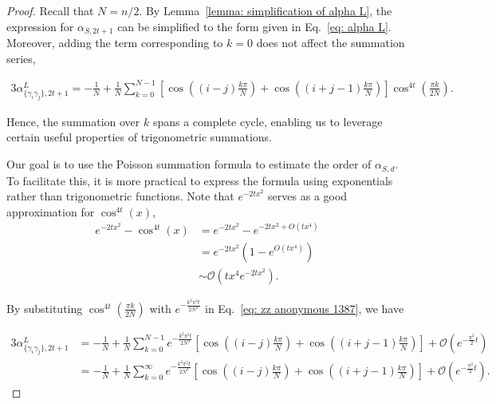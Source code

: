 \documentclass[journal=jctcce,a4paper,manuscript=article]{achemso}
\newcommand{\alpl}{\alpha_{\{\gamma_i\gamma_j\}, 2t+1}^{L}}
\begin{document}
\begin{proof}
  Recall that $N = n/2$. By Lemma~\ref{lemma: simplification of alpha L}, the expression for $\alpha_{S,2t+1}$ can be simplified to the form given in Eq.~\eqref{eq: alpha L}. Moreover, adding the term corresponding to $k=0$ does not affect the summation series,

  \begin{equation}
    \label{eq: zz anonymous 1387}
    \begin{aligned}
      3\alpl
      =-\frac{1}{N}+\frac{1}{N} \sum_{k=0}^{N-1}\left[\cos \left((i-j) \frac{k \pi}{N}\right)+\cos \left((i+j-1) \frac{k \pi}{N}\right)\right] \cos ^{4 t}\left(\frac{\pi k}{2 N}\right).
    \end{aligned}
  \end{equation}

  Hence, the summation over $k$ spans a complete cycle, enabling us to leverage
  certain useful properties of trigonometric summations.

  Our goal is to use the Poisson summation formula to estimate the order of
  $\alpha_{S,d}$. To facilitate this, it is more practical to express the formula
  using exponentials rather than trigonometric functions. Note that $e^{-2tx^2}$
  serves as a good approximation for $\cos^{4t}(x)$,
  \begin{equation}
    \begin{aligned}
      e^{-2 t x^2}-\cos ^{4 t}(x) & =  e^{-2 t x^2}-e^{-2 t x^2+O\left(t x^4\right)}      \\
                                  & =  e^{-2 t x^2}\left(1-e^{O\left(t x^4\right)}\right) \\
                                  & \sim \mathcal{O}\left(t x^4 e^{-2 t x^2}\right).
    \end{aligned}
  \end{equation}

  By substituting $\cos ^{4 t}\left(\frac{\pi k}{2 N}\right)$ with $e^{-\frac{k^2
          \pi^2 t}{2N^2}}$ in Eq.~\eqref{eq: zz anonymous 1387}, we have

  \begin{align}
    3\alpl & =-\frac{1}{N}+\frac{1}{N} \sum_{k=0}^{N-1} e^{-\frac{k^2 \pi^2 t}{2 N^2}}\left[\cos \left((i-j) \frac{k \pi}{N}\right)+\cos \left((i+j-1) \frac{k \pi}{N}\right)\right]+\mathcal{O}\left(e^{-\frac{\pi^2}{2}t}\right)    \\
           & =-\frac{1}{N}+\frac{1}{N} \sum_{k=0}^{\infty}e^{-\frac{k^2 \pi^2 t}{2 N^2}}\left[\cos \left((i-j) \frac{k \pi}{N}\right)+\cos \left((i+j-1) \frac{k \pi}{N}\right)\right]+\mathcal{O}\left(e^{-\frac{\pi^2}{2}t}\right).
    \label{eq: zz anonymous 19}
  \end{align}


\end{proof}
\end{document}
